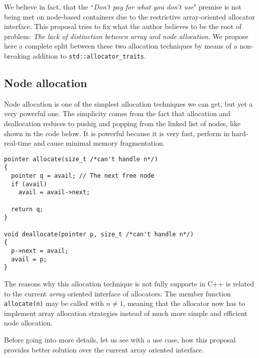 \documentclass[11pt]{article}
\begin{document}
We believe in fact, that the ``{\it Don't pay for what you don't use}" premise
is not being met on node-based containers due to the restrictive
array-oriented allocator interface. This proposal tries to fix what the author
believes to be the root of problem: {\it The lack of distinction between array
and node allocation}.  We propose here a complete split between these two
allocation techniques by means of a non-breaking addition to
\texttt{std::allocator\_traits}.

\subsection{Node allocation}
Node allocation is one of the simplest allocation techniques
we can get, but yet a very powerful one. The simplicity
comes from the fact that allocation and deallocation reduces to pushig and
popping from the linked list of nodes, like shown in the code below.
It is powerful because it is very fast, perform in hard-real-time
and cause minimal memory fragmentation.

\medskip
\begin{lstlisting}
pointer allocate(size_t /*can't handle n*/)
{
  pointer q = avail; // The next free node
  if (avail)
    avail = avail->next;

  return q;
}

void deallocate(pointer p, size_t /*can't handle n*/)
{
  p->next = avail;
  avail = p;
}

\end{lstlisting}

The reasons why this allocation technique is not fully supporte in C++ is
related to the current {\it array} oriented interface of allocators.  The
member function \texttt{allocate(n)} may be called with $n \ne 1$, meaning that
the allocator now has to implement array allocation strategies instead of much
more simple and efficient node allocation.

Before going into more details, let us see with a use case,
how this proposal provides better solution over the current
array oriented interface.
\end{document}
